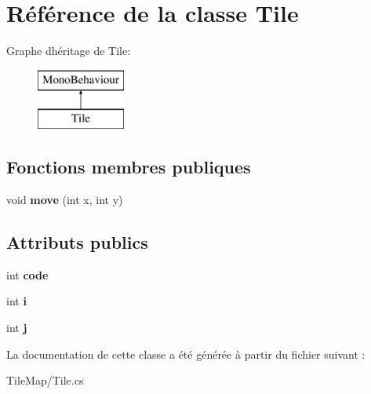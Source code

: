 \hypertarget{class_tile}{}\section{Référence de la classe Tile}
\label{class_tile}
Graphe d\textquotesingle{}héritage de Tile\+:\begin{figure}[H]
\begin{center}
\leavevmode
\includegraphics[height=2.000000cm]{class_tile}
\end{center}
\end{figure}
\subsection*{Fonctions membres publiques}
\begin{DoxyCompactItemize}
\item 
\mbox{\label{class_tile_a60ee8f081cb0f74d6587a5cefc7978ba}} 
void {\bfseries move} (int x, int y)
\end{DoxyCompactItemize}
\subsection*{Attributs publics}
\begin{DoxyCompactItemize}
\item 
\mbox{\label{class_tile_a19beb0bc38c9fe2c8010e383f837f399}} 
int {\bfseries code}
\item 
\mbox{\label{class_tile_ad3c0cca342774de090545a0a05e5b3af}} 
int {\bfseries i}
\item 
\mbox{\label{class_tile_a1a90025da8043aed9138767589671bfa}} 
int {\bfseries j}
\end{DoxyCompactItemize}


La documentation de cette classe a été générée à partir du fichier suivant \+:\begin{DoxyCompactItemize}
\item 
Tile\+Map/Tile.\+cs\end{DoxyCompactItemize}
